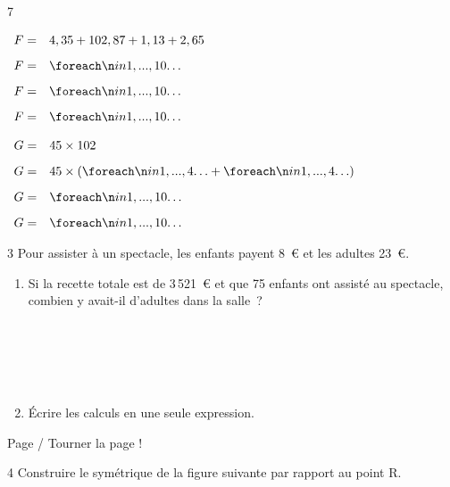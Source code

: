 \documentclass[a4paper]{book}
\begin{document}
{\begin{exerciceNote}{7}
\begin{minipage}{0.3\linewidth}
            \bigskip

            $\begin{array}{ll}
                F = & 4,35 + 102,87+1,13+2,65 \\[2ex]
                F = & \points[10]\\[2ex]
                F = & \points[10]\\[2ex]
                F = & \points[10]
            \end{array}$

            \bigskip

            $\begin{array}{ll}
                G = & 45\times102 \\[2ex]
                G = & 45\times (\points[4]+\points[4])\\[2ex]
                G = & \points[10]\\[2ex]
                G = & \points[10]
            \end{array}$
        \end{minipage}
    \end{exerciceNote}


    \begin{exerciceNote}{3}
        Pour assister à un spectacle, les enfants payent 8~\euro{} et les adultes 23~\euro{}.

        \begin{enumerate}[leftmargin=*]
            \item Si la recette totale est de 3\,521~\euro{} et que 75 enfants ont assisté au spectacle, combien y avait-il d'adultes dans la salle~?

            \points[35] \\ \points[35] \\ \points[35] \\ \points[35] \\ \points[35]
            
            \item Écrire les calculs en une seule expression.
            
            \points[39]
            
        \end{enumerate}
    \end{exerciceNote}


\vfill
Page \thepage/\pageref{LastPage} \hfill Tourner la page !
\newpage


    \begin{exerciceNote}{4}
        Construire le symétrique de la figure suivante par rapport au point R.


\end{exerciceNote}}
\end{document}
